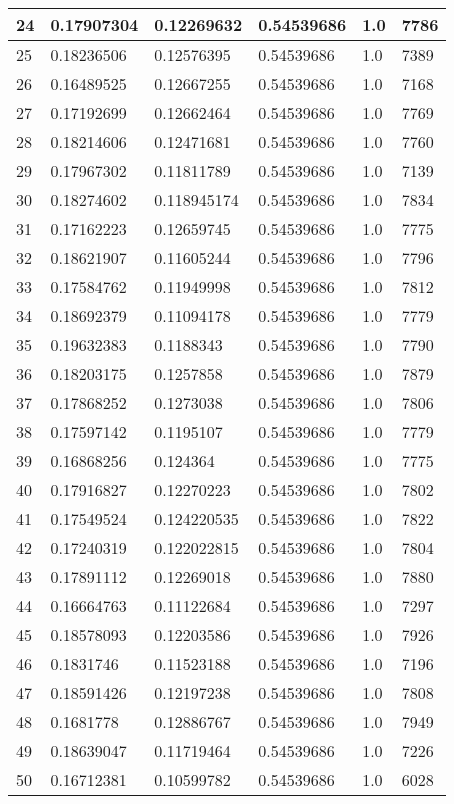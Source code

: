 \begin{longtable}{|l|l|l|l|l|l|}
24 & 0.17907304 & 0.12269632 & 0.54539686 & 1.0 & 7786 \\ \hline 
25 & 0.18236506 & 0.12576395 & 0.54539686 & 1.0 & 7389 \\ \hline 
26 & 0.16489525 & 0.12667255 & 0.54539686 & 1.0 & 7168 \\ \hline 
27 & 0.17192699 & 0.12662464 & 0.54539686 & 1.0 & 7769 \\ \hline 
28 & 0.18214606 & 0.12471681 & 0.54539686 & 1.0 & 7760 \\ \hline 
29 & 0.17967302 & 0.11811789 & 0.54539686 & 1.0 & 7139 \\ \hline 
30 & 0.18274602 & 0.118945174 & 0.54539686 & 1.0 & 7834 \\ \hline 
31 & 0.17162223 & 0.12659745 & 0.54539686 & 1.0 & 7775 \\ \hline 
32 & 0.18621907 & 0.11605244 & 0.54539686 & 1.0 & 7796 \\ \hline 
33 & 0.17584762 & 0.11949998 & 0.54539686 & 1.0 & 7812 \\ \hline 
34 & 0.18692379 & 0.11094178 & 0.54539686 & 1.0 & 7779 \\ \hline 
35 & 0.19632383 & 0.1188343 & 0.54539686 & 1.0 & 7790 \\ \hline 
36 & 0.18203175 & 0.1257858 & 0.54539686 & 1.0 & 7879 \\ \hline 
37 & 0.17868252 & 0.1273038 & 0.54539686 & 1.0 & 7806 \\ \hline 
38 & 0.17597142 & 0.1195107 & 0.54539686 & 1.0 & 7779 \\ \hline 
39 & 0.16868256 & 0.124364 & 0.54539686 & 1.0 & 7775 \\ \hline 
40 & 0.17916827 & 0.12270223 & 0.54539686 & 1.0 & 7802 \\ \hline 
41 & 0.17549524 & 0.124220535 & 0.54539686 & 1.0 & 7822 \\ \hline 
42 & 0.17240319 & 0.122022815 & 0.54539686 & 1.0 & 7804 \\ \hline 
43 & 0.17891112 & 0.12269018 & 0.54539686 & 1.0 & 7880 \\ \hline 
44 & 0.16664763 & 0.11122684 & 0.54539686 & 1.0 & 7297 \\ \hline 
45 & 0.18578093 & 0.12203586 & 0.54539686 & 1.0 & 7926 \\ \hline 
46 & 0.1831746 & 0.11523188 & 0.54539686 & 1.0 & 7196 \\ \hline 
47 & 0.18591426 & 0.12197238 & 0.54539686 & 1.0 & 7808 \\ \hline 
48 & 0.1681778 & 0.12886767 & 0.54539686 & 1.0 & 7949 \\ \hline 
49 & 0.18639047 & 0.11719464 & 0.54539686 & 1.0 & 7226 \\ \hline 
50 & 0.16712381 & 0.10599782 & 0.54539686 & 1.0 & 6028 \\ \hline 
\end{longtable}